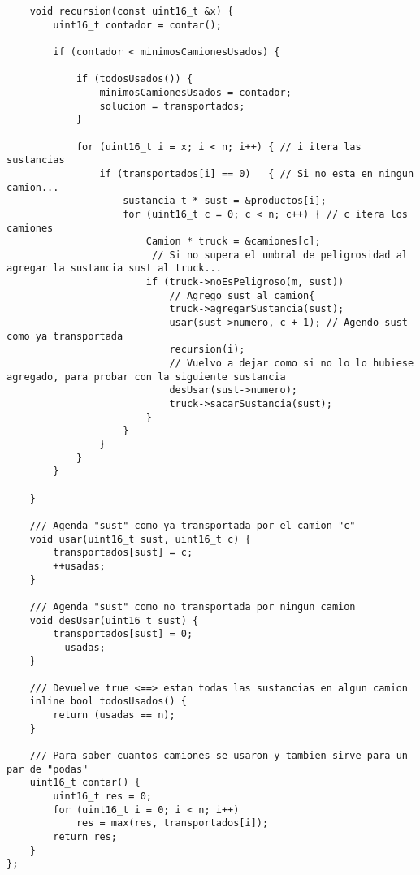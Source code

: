 \begin{frame}
\begin{lstlisting}
	void recursion(const uint16_t &x) {
		uint16_t contador = contar();

		if (contador < minimosCamionesUsados) {

			if (todosUsados()) {
				minimosCamionesUsados = contador;
				solucion = transportados;
			}

			for (uint16_t i = x; i < n; i++) { // i itera las sustancias
				if (transportados[i] == 0)   { // Si no esta en ningun camion...
					sustancia_t * sust = &productos[i];
					for (uint16_t c = 0; c < n; c++) { // c itera los camiones
						Camion * truck = &camiones[c];
						 // Si no supera el umbral de peligrosidad al agregar la sustancia sust al truck...
						if (truck->noEsPeligroso(m, sust)) 
							// Agrego sust al camion{
							truck->agregarSustancia(sust); 
							usar(sust->numero, c + 1); // Agendo sust como ya transportada
							recursion(i);
							// Vuelvo a dejar como si no lo lo hubiese agregado, para probar con la siguiente sustancia
							desUsar(sust->numero);
							truck->sacarSustancia(sust);
						}
					}
				}
			}
		}

	}

	/// Agenda "sust" como ya transportada por el camion "c"
	void usar(uint16_t sust, uint16_t c) {
		transportados[sust] = c;
		++usadas;
	}

	/// Agenda "sust" como no transportada por ningun camion
	void desUsar(uint16_t sust) {
		transportados[sust] = 0;
		--usadas;
	}

	/// Devuelve true <==> estan todas las sustancias en algun camion
	inline bool todosUsados() {
		return (usadas == n);
	}

	/// Para saber cuantos camiones se usaron y tambien sirve para un par de "podas"
	uint16_t contar() {
		uint16_t res = 0;
		for (uint16_t i = 0; i < n; i++)
			res = max(res, transportados[i]);
		return res;
	}
};

\end{lstlisting}
\end{frame}

